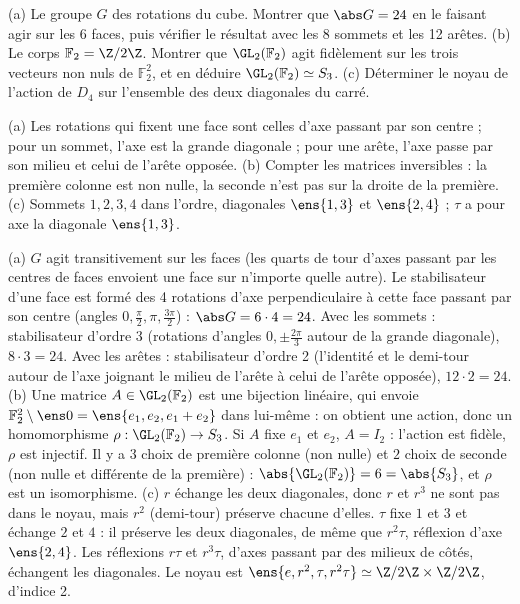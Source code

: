 \begin{exo}
(a) Le groupe $G$ des rotations du cube. Montrer que $\abs G=24$ en le faisant agir sur les 6 faces, puis vérifier le résultat avec les 8 sommets et les 12 arêtes. (b) Le corps $\mathbb F_2=\Z/2\Z$. Montrer que $\GL_2(\mathbb F_2)$ agit fidèlement sur les trois vecteurs non nuls de $\mathbb F_2^2$, et en déduire $\GL_2(\mathbb F_2)\simeq S_3$. (c) Déterminer le noyau de l'action de $D_4$ sur l'ensemble des deux diagonales du carré.
\begin{indication}
(a) Les rotations qui fixent une face sont celles d'axe passant par son centre ; pour un sommet, l'axe est la grande diagonale ; pour une arête, l'axe passe par son milieu et celui de l'arête opposée. (b) Compter les matrices inversibles : la première colonne est non nulle, la seconde n'est pas sur la droite de la première. (c) Sommets $1,2,3,4$ dans l'ordre, diagonales $\ens{1,3}$ et $\ens{2,4}$ ; $\tau$ a pour axe la diagonale $\ens{1,3}$.
\end{indication}
\begin{corrige}
(a) $G$ agit transitivement sur les faces (les quarts de tour d'axes passant par les centres de faces envoient une face sur n'importe quelle autre). Le stabilisateur d'une face est formé des 4 rotations d'axe perpendiculaire à cette face passant par son centre (angles $0,\frac\pi2,\pi,\frac{3\pi}2$) : $\abs G=6\cdot4=24$. Avec les sommets : stabilisateur d'ordre 3 (rotations d'angles $0,\pm\frac{2\pi}3$ autour de la grande diagonale), $8\cdot3=24$. Avec les arêtes : stabilisateur d'ordre 2 (l'identité et le demi-tour autour de l'axe joignant le milieu de l'arête à celui de l'arête opposée), $12\cdot2=24$.
(b) Une matrice $A\in\GL_2(\mathbb F_2)$ est une bijection linéaire, qui envoie $\mathbb F_2^2\setminus\ens0=\ens{e_1,e_2,e_1+e_2}$ dans lui-même : on obtient une action, donc un homomorphisme $\rho:\GL_2(\mathbb F_2)\to S_3$. Si $A$ fixe $e_1$ et $e_2$, $A=I_2$ : l'action est fidèle, $\rho$ est injectif. Il y a $3$ choix de première colonne (non nulle) et $2$ choix de seconde (non nulle et différente de la première) : $\abs{\GL_2(\mathbb F_2)}=6=\abs{S_3}$, et $\rho$ est un isomorphisme.
(c) $r$ échange les deux diagonales, donc $r$ et $r^3$ ne sont pas dans le noyau, mais $r^2$ (demi-tour) préserve chacune d'elles. $\tau$ fixe $1$ et $3$ et échange $2$ et $4$ : il préserve les deux diagonales, de même que $r^2\tau$, réflexion d'axe $\ens{2,4}$. Les réflexions $r\tau$ et $r^3\tau$, d'axes passant par des milieux de côtés, échangent les diagonales. Le noyau est $\ens{e,r^2,\tau,r^2\tau}\simeq\Z/2\Z\times\Z/2\Z$, d'indice 2.
\end{corrige}
\end{exo}


